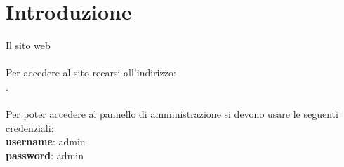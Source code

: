 \newpage
\section{Introduzione}
Il sito web 
~\\ ~\\
Per accedere al sito recarsi all'indirizzo:\\ \url{}.~\\ ~\\
Per poter accedere al pannello di amministrazione
si devono usare le seguenti credenziali:\\ 
\textbf{username}: admin \\ 
\textbf{password}: admin \\